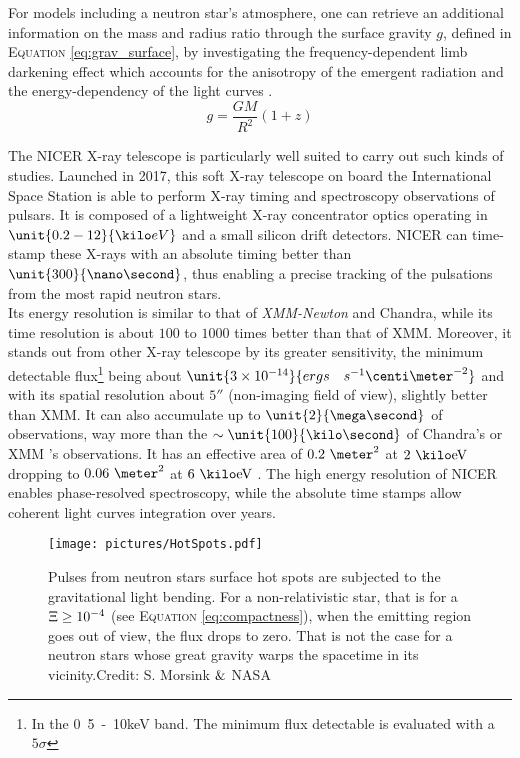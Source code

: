 \documentclass[a4paper, twoside, 12pt]{article}
\numberwithin{equation}{section}
\begin{document}
For models including a neutron star's atmosphere\cite{HotSpots}, one can retrieve an additional information on the mass and radius ratio through the surface gravity $g$, defined in  E\textsc{quation} \ref{eq:grav_surface},  by investigating the frequency-dependent limb darkening effect which accounts for the anisotropy of the emergent radiation and the energy-dependency of the light curves \cite{atmosphere_modeling}. \\
\begin{equation}
g = \frac{GM}{R^2} (1+z)
\label{eq:grav_surface}
\end{equation}

The NICER X-ray telescope is particularly well suited to carry out such kinds of studies. Launched in 2017, this soft X-ray telescope on board the International Space Station is able to perform X-ray timing and spectroscopy observations of pulsars\cite{NICER_mission}. It is composed of a lightweight X-ray concentrator optics operating in $\unit{0.2-12}{\kilo eV} $ and a small silicon drift detectors. NICER can time-stamp these X-rays with an absolute timing better than $\unit{300}{\nano \second}$, thus enabling a precise tracking of the pulsations from the most rapid neutron stars. \\


Its energy resolution is similar to that of {\itshape{XMM-Newton}} and Chandra, while its time resolution is about $100$ to $1000$ times better than that of XMM. Moreover, it stands out from other X-ray telescope by its greater sensitivity, the minimum detectable flux\footnote{In the \unit{0.5-10}{keV} band. The minimum flux detectable is evaluated with a $5 \sigma$}   being about $\unit{3\times 10^{-14}}{ergs\quad s^{-1} {\centi\meter}^{-2}}$ and with its spatial resolution about $5''$ (non-imaging field of view), slightly better than XMM. It can also accumulate up to $\unit{2} {\mega \second}$ of observations, way more than the $\sim \unit{100 }{\kilo \second}$ of Chandra's or XMM 's observations. It has an effective area of $0.2 \  \meter^2$ at $2 \ \kilo\rm{eV}$ dropping to $0.06 \  \meter^2$ at $6 \ \kilo\rm{eV}$ \cite{NICER_mission}. The high energy resolution of NICER enables phase-resolved spectroscopy, while the absolute time stamps allow coherent light curves integration over years. 

\begin{figure}[!h]
\centering
\texttt{[image: pictures/HotSpots.pdf]}
\caption[Light bending effect on pulses from neutron stars surface hot spots]{Pulses from neutron stars surface hot spots are subjected to the gravitational light bending. For a non-relativistic star, that is for a $\protect\Xi \protect \geq 10^{-4}$  (see E\textsc{quation} \ref{eq:compactness}),  when the emitting region goes out of view, the flux drops to zero.  That is not the case for a neutron stars whose great gravity warps the spacetime in its vicinity.\footnotesize{Credit: S. Morsink $\protect\&$ NASA }}
\label{fig:HotSpots}
\end{figure}
\end{document}
